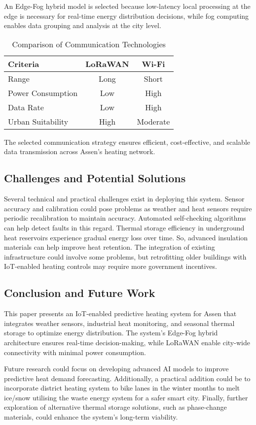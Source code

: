 \documentclass[conference]{IEEEtran}
\begin{document}
An Edge-Fog hybrid model is selected because low-latency local processing at the edge is necessary for real-time energy distribution decisions, while fog computing enables data grouping and analysis at the city level.

\begin{table}[h]
\centering
\caption{Comparison of Communication Technologies}
\begin{tabular}{|l|c|c|}
\hline
\textbf{Criteria} & \textbf{LoRaWAN} & \textbf{Wi-Fi} \\
\hline
Range & Long & Short \\
Power Consumption & Low & High \\
Data Rate & Low & High \\
Urban Suitability & High & Moderate \\
\hline
\end{tabular}
\end{table}

The selected communication strategy ensures efficient, cost-effective, and scalable data transmission across Assen’s heating network.

\subsection{Challenges and Potential Solutions}

Several technical and practical challenges exist in deploying this system. Sensor accuracy and calibration could pose problems as weather and heat sensors require periodic recalibration to maintain accuracy. Automated self-checking algorithms can help detect faults in this regard. Thermal storage efficiency in underground heat reservoirs experience gradual energy loss over time. So, advanced insulation materials can help improve heat retention. The integration of existing infrastructure could involve some problems, but retrofitting older buildings with IoT-enabled heating controls may require more government incentives.

\subsection{Conclusion and Future Work}

This paper presents an IoT-enabled predictive heating system for Assen that integrates weather sensors, industrial heat monitoring, and seasonal thermal storage to optimize energy distribution. The system’s Edge-Fog hybrid architecture ensures real-time decision-making, while LoRaWAN enable city-wide connectivity with minimal power consumption.

Future research could focus on developing advanced AI models to improve predictive heat demand forecasting. Additionally, a practical addition could be to incorporate district heating system to bike lanes in the winter months to melt ice/snow utilising the waste energy system for a safer smart city. Finally, further exploration of alternative thermal storage solutions, such as phase-change materials, could enhance the system’s long-term viability.



\end{document}
